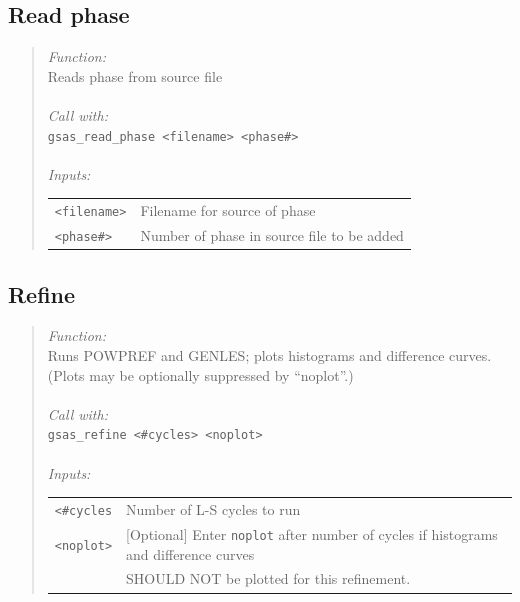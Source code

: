 \documentclass{article}
\begin{document}
\subsection{Read phase}
\begin{quote}
\textit{Function:} \\
Reads phase from source file \\ \\
\textit{Call with:}\\
\texttt{gsas\_read\_phase <filename> <phase\#>} \\ \\
\textit{Inputs:} \\ 
\begin{tabular}[t]{l l}
\texttt{<filename>} &  Filename for source of phase \\
\texttt{<phase\#>} & Number of phase in source file to be added \\ 
\end{tabular}
\end{quote}

\subsection{Refine}
\begin{quote}
\textit{Function:} \\
Runs POWPREF and GENLES; plots histograms and difference curves.\\ (Plots may be optionally suppressed by
``noplot''.) \\ \\
\textit{Call with:} \\
\texttt{gsas\_refine <\#cycles> <noplot>} \\ \\
\textit{Inputs:}\\
\begin{tabular}[t]{l l}
\texttt{<\#cycles} &	Number of L-S cycles to run \\
\texttt{<noplot>} &  [Optional] Enter \texttt{noplot} after number of cycles if histograms and difference curves \\
	& SHOULD NOT be plotted for this refinement. \\
\end{tabular}
\end{quote}

\end{document}
